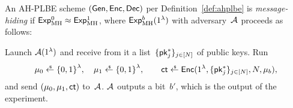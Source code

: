 \begin{definition}\label{def:ahplbe-message-hiding}
An AH-PLBE scheme $(\Gen,\Enc,\Dec)$ per Definition~\ref{def:ahplbe}
is \emph{message-hiding} if ${\ExpMH{0}\approx\ExpMH{1}}$,
where $\ExpMH{b}(1^\lambda)$ with adversary~${\mathcal{A}}$ proceeds as follows:
\begin{security}
Launch ${\mathcal{A}}(1^\lambda)$ and
receive from it a list~$\{\pk^\ast_j\}_{j\in[N]}$ of public keys.
Run
\begin{align*}
\mu_0\draws\bit^\lambda,\quad
\mu_1\draws\bit^\lambda,\qquad
\ct\draws\Enc(1^\lambda,\{\pk^\ast_j\}_{j\in[N]},N,\mu_b),
\end{align*}
and send $(\mu_0,\mu_1,\ct)$ to~${\mathcal{A}}$.
${\mathcal{A}}$ outputs a bit~$b'$, which is the output of the experiment.
\end{security}
\end{definition}
